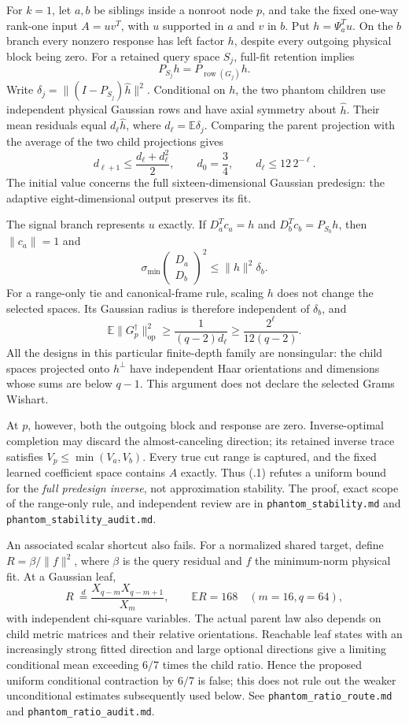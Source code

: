 \documentclass[11pt,oneside,openany,a4paper]{book}
\numberwithin{equation}{chapter}
\theoremstyle{definition}
\theoremstyle{remark}
\newcommand{\sourcefile}[1]{{\small\nolinkurl{#1}}}
\begin{document}
For $k=1$, let $a,b$ be siblings inside a nonroot node $p$, and take the
fixed one-way rank-one input $A=uv^T$, with $u$ supported in $a$ and $v$
in $b$.  Put $h=\Psi_a^Tu$.  On the $b$ branch every nonzero response
has left factor $h$, despite every outgoing physical block being zero.
For a retained query space $S_j$, full-fit retention implies
\[
 P_{S_j}h=P_{\operatorname{row}(G_j)}h.
\]
Write $\delta_j=\|(I-P_{S_j})\widehat h\|^2$.  Conditional on $h$,
the two phantom children use independent physical Gaussian rows and
have axial symmetry about $\widehat h$.  Their mean residuals equal
$d_\ell\widehat h$, where $d_\ell=\mathbb E\delta_j$.  Comparing the
parent projection with the average of the two child projections gives
\[
 d_{\ell+1}\le\frac{d_\ell+d_\ell^2}{2},\qquad
 d_0=\frac34,\qquad d_\ell\le12\,2^{-\ell}.
\]
The initial value concerns the full sixteen-dimensional Gaussian
predesign: the adaptive eight-dimensional output preserves its fit.

The signal branch represents $u$ exactly.  If $D_a^Tc_a=h$ and
$D_b^Tc_b=P_{S_b}h$, then $\|c_a\|=1$ and
\[
 \sigma_{\min}\!\begin{pmatrix}D_a\\D_b\end{pmatrix}^{\!2}
 \le\|h\|^2\delta_b.
\]
For a range-only tie and canonical-frame rule, scaling $h$ does not
change the selected spaces.  Its Gaussian radius is therefore
independent of $\delta_b$, and
\[
 \mathbb E\|G_p^\dagger\|_{\mathrm{op}}^2
 \ge\frac{1}{(q-2)d_\ell}
 \ge\frac{2^\ell}{12(q-2)}.
 \tag{\thechapter.1}
\]
All the designs in this particular finite-depth family are nonsingular:
the child spaces projected onto $h^\perp$ have independent Haar
orientations and dimensions whose sums are below $q-1$.  This argument
does not declare the selected Grams Wishart.

At $p$, however, both the outgoing block and response are zero.
Inverse-optimal completion may discard the almost-canceling direction;
its retained inverse trace satisfies $V_p\le\min(V_a,V_b)$.  Every
true cut range is captured, and the fixed learned coefficient space
contains $A$ exactly.  Thus (\thechapter.1) refutes a uniform bound for
the \emph{full predesign inverse}, not approximation stability.
The proof, exact scope of the range-only rule, and independent review
are in \sourcefile{phantom_stability.md} and
\sourcefile{phantom_stability_audit.md}.

An associated scalar shortcut also fails.  For a normalized shared
target, define $R=\beta/\|f\|^2$, where $\beta$ is the query residual
and $f$ the minimum-norm physical fit.  At a Gaussian leaf,
\[
 R\ \stackrel{d}{=}
 \frac{X_{q-m}X_{q-m+1}}{X_m},\qquad \mathbb ER=168
 \quad(m=16,q=64),
\]
with independent chi-square variables.  The actual parent law also
depends on child metric matrices and their relative orientations.
Reachable leaf states with an increasingly strong fitted direction and
large optional directions give a limiting conditional mean exceeding
$6/7$ times the child ratio.  Hence the proposed uniform conditional
contraction by $6/7$ is false; this does not rule out the weaker
unconditional estimates subsequently used below.
See \sourcefile{phantom_ratio_route.md} and
\sourcefile{phantom_ratio_audit.md}.
\end{document}
